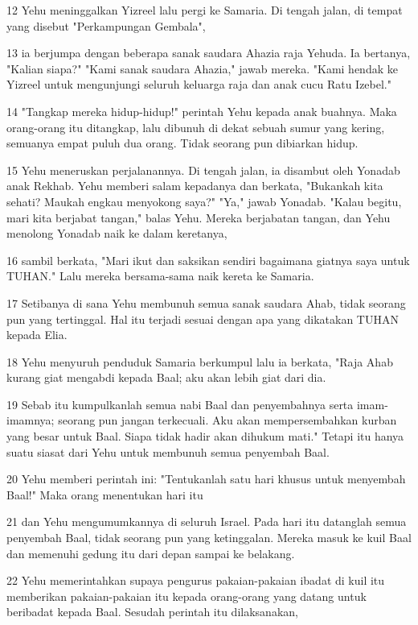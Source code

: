 \par 12 Yehu meninggalkan Yizreel lalu pergi ke Samaria. Di tengah jalan, di tempat yang disebut "Perkampungan Gembala",
\par 13 ia berjumpa dengan beberapa sanak saudara Ahazia raja Yehuda. Ia bertanya, "Kalian siapa?" "Kami sanak saudara Ahazia," jawab mereka. "Kami hendak ke Yizreel untuk mengunjungi seluruh keluarga raja dan anak cucu Ratu Izebel."
\par 14 "Tangkap mereka hidup-hidup!" perintah Yehu kepada anak buahnya. Maka orang-orang itu ditangkap, lalu dibunuh di dekat sebuah sumur yang kering, semuanya empat puluh dua orang. Tidak seorang pun dibiarkan hidup.
\par 15 Yehu meneruskan perjalanannya. Di tengah jalan, ia disambut oleh Yonadab anak Rekhab. Yehu memberi salam kepadanya dan berkata, "Bukankah kita sehati? Maukah engkau menyokong saya?" "Ya," jawab Yonadab. "Kalau begitu, mari kita berjabat tangan," balas Yehu. Mereka berjabatan tangan, dan Yehu menolong Yonadab naik ke dalam keretanya,
\par 16 sambil berkata, "Mari ikut dan saksikan sendiri bagaimana giatnya saya untuk TUHAN." Lalu mereka bersama-sama naik kereta ke Samaria.
\par 17 Setibanya di sana Yehu membunuh semua sanak saudara Ahab, tidak seorang pun yang tertinggal. Hal itu terjadi sesuai dengan apa yang dikatakan TUHAN kepada Elia.
\par 18 Yehu menyuruh penduduk Samaria berkumpul lalu ia berkata, "Raja Ahab kurang giat mengabdi kepada Baal; aku akan lebih giat dari dia.
\par 19 Sebab itu kumpulkanlah semua nabi Baal dan penyembahnya serta imam-imamnya; seorang pun jangan terkecuali. Aku akan mempersembahkan kurban yang besar untuk Baal. Siapa tidak hadir akan dihukum mati." Tetapi itu hanya suatu siasat dari Yehu untuk membunuh semua penyembah Baal.
\par 20 Yehu memberi perintah ini: "Tentukanlah satu hari khusus untuk menyembah Baal!" Maka orang menentukan hari itu
\par 21 dan Yehu mengumumkannya di seluruh Israel. Pada hari itu datanglah semua penyembah Baal, tidak seorang pun yang ketinggalan. Mereka masuk ke kuil Baal dan memenuhi gedung itu dari depan sampai ke belakang.
\par 22 Yehu memerintahkan supaya pengurus pakaian-pakaian ibadat di kuil itu memberikan pakaian-pakaian itu kepada orang-orang yang datang untuk beribadat kepada Baal. Sesudah perintah itu dilaksanakan,
